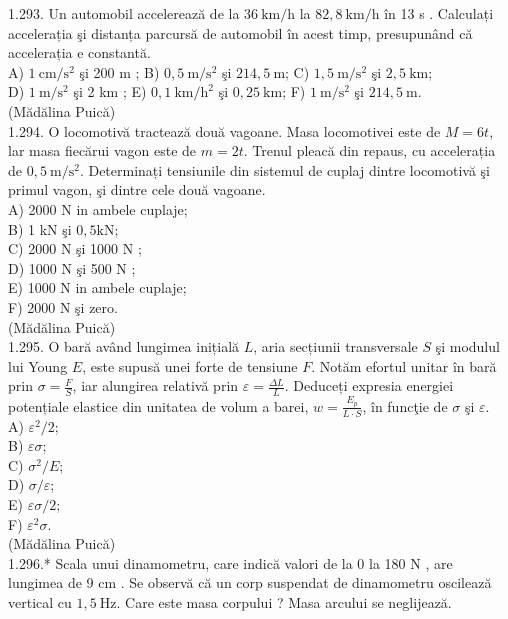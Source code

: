 \documentclass[10pt]{article}
\begin{document}
1.293. Un automobil accelerează de la $36 \mathrm{~km} / \mathrm{h}$ la $82,8 \mathrm{~km} / \mathrm{h}$ în 13 s . Calculați accelerația şi distanța parcursă de automobil în acest timp, presupunând că accelerația e constantă.\\
A) $1 \mathrm{~cm} / \mathrm{s}^{2}$ şi 200 m ; B) $0,5 \mathrm{~m} / \mathrm{s}^{2}$ şi $214,5 \mathrm{~m}$; C) $1,5 \mathrm{~m} / \mathrm{s}^{2}$ şi $2,5 \mathrm{~km}$;\\
D) $1 \mathrm{~m} / \mathrm{s}^{2}$ şi 2 km ; E) $0,1 \mathrm{~km} / \mathrm{h}^{2}$ şi $0,25 \mathrm{~km}$; F) $1 \mathrm{~m} / \mathrm{s}^{2}$ şi $214,5 \mathrm{~m}$.\\
(Mădălina Puică)\\
1.294. O locomotivă tractează două vagoane. Masa locomotivei este de $M=6 t$, lar masa fiecărui vagon este de $m=2 t$. Trenul pleacă din repaus, cu accelerația de $0,5 \mathrm{~m} / \mathrm{s}^{2}$. Determinați tensiunile din sistemul de cuplaj dintre locomotivă şi primul vagon, şi dintre cele două vagoane.\\
A) 2000 N in ambele cuplaje;\\
B) 1 kN şi $0,5 \mathrm{kN}$;\\
C) 2000 N şi 1000 N ;\\
D) 1000 N şi 500 N ;\\
E) 1000 N in ambele cuplaje;\\
F) 2000 N şi zero.\\
(Mădălina Puică)\\
1.295. O bară având lungimea inițială $L$, aria secțiunii transversale $S$ şi modulul lui Young $E$, este supusă unei forte de tensiune $F$. Notăm efortul unitar în bară prin $\sigma=\frac{F}{S}$, iar alungirea relativă prin $\varepsilon=\frac{\Delta L}{L}$. Deduceți expresia energiei potențiale elastice din unitatea de volum a barei, $w=\frac{E_{p}}{L \cdot S}$, în funcţie de $\sigma$ şi $\varepsilon$.\\
A) $\varepsilon^{2} / 2$;\\
B) $\varepsilon \sigma$;\\
C) $\sigma^{2} / E$;\\
D) $\sigma / \varepsilon$;\\
E) $\varepsilon \sigma / 2$;\\
F) $\varepsilon^{2} \sigma$.\\
(Mădălina Puică)\\
1.296.* Scala unui dinamometru, care indică valori de la 0 la 180 N , are lungimea de 9 cm . Se observă că un corp suspendat de dinamometru oscilează vertical cu $1,5 \mathrm{~Hz}$. Care este masa corpului ? Masa arcului se neglijează.\\
\end{document}
